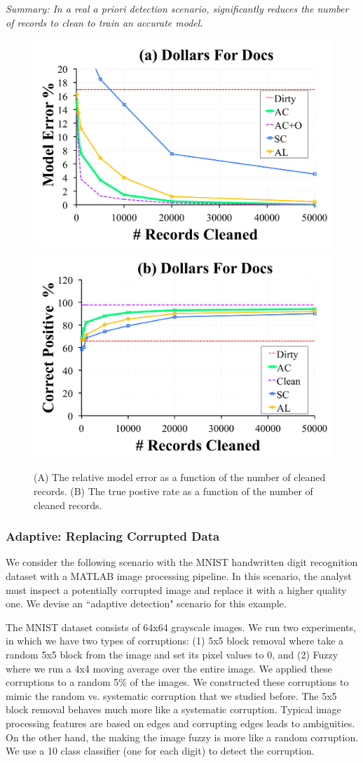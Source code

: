 \vspace{0.25em}

\noindent \emph{Summary: In a real a priori detection scenario, \sys significantly reduces the number of records to clean to train an accurate model. }

\begin{figure}[ht!]
\centering
 \includegraphics[width=0.49\columnwidth]{exp/exp13a.pdf}
 \includegraphics[width=0.49\columnwidth]{exp/exp13b.pdf}
 \caption{(A) The relative model error as a function of the number of cleaned records. (B) The true postive rate as a function of the number of cleaned records. \label{dfd}}
\end{figure}

\subsubsection{Adaptive: Replacing Corrupted Data}
We consider the following scenario with the MNIST handwritten digit recognition dataset with a MATLAB image processing pipeline.
In this scenario, the analyst must inspect a potentially corrupted image and replace it with a higher quality one.
We devise an ``adaptive detection" \sys scenario for this example.

The MNIST dataset consists of 64x64 grayscale images.
We run two experiments, in which we have two types of corruptions: (1) 5x5 block removal where take a random 5x5 block from the image and set its pixel values to 0, and (2) Fuzzy where we run a 4x4 moving average over the entire image.
We applied these corruptions to a random 5\% of the images.
We constructed these corruptions to mimic the random vs. systematic corruption that we studied before.
The 5x5 block removal behaves much more like a systematic corruption. 
Typical image processing features are based on edges and corrupting edges leads to ambiguities.
On the other hand, the making the image fuzzy is more like a random corruption.
We use a 10 class classifier (one for each digit) to detect the corruption.

